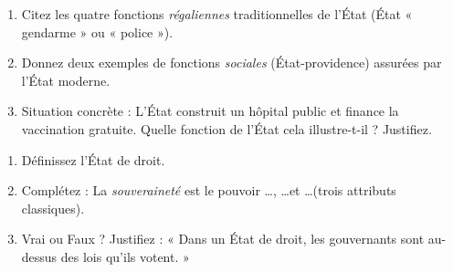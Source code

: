 \documentclass[11pt]{article}
\begin{document}
\begin{exercice}
\begin{enumerate}
    \item Citez les quatre fonctions \textit{régaliennes} traditionnelles de l'État (État « gendarme » ou « police »).
    \item Donnez deux exemples de fonctions \textit{sociales} (État-providence) assurées par l'État moderne.
    \item Situation concrète : L'État construit un hôpital public et finance la vaccination gratuite. Quelle fonction de l'État cela illustre-t-il ? Justifiez.
\end{enumerate}
\end{exercice}

\begin{exercice}
\begin{enumerate}
    \item Définissez l'État de droit.
    \item Complétez : La \textit{souveraineté} est le pouvoir \ldots , \ldots et \ldots (trois attributs classiques).
    \item Vrai ou Faux ? Justifiez : « Dans un État de droit, les gouvernants sont au-dessus des lois qu'ils votent. »
\end{enumerate}
\end{exercice}
\end{document}
